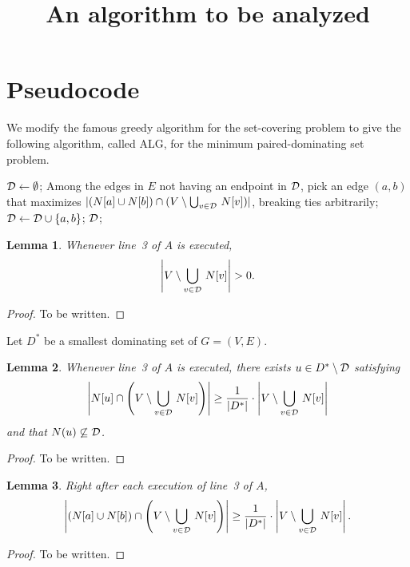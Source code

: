\documentclass[12pt]{article}
\title{An algorithm to be analyzed}
\date{}
\begin{document}
\maketitle

\newtheorem{lemma}{Lemma}

\section{Pseudocode}

We modify
the
famous greedy algorithm for the set-covering problem
to give the following algorithm, called ALG, for
the minimum paired-dominating set problem.

\begin{algorithmic}[1]
\STATE ${\cal D}\leftarrow \emptyset$;
  \STATE Among the edges in $E$ not having an endpoint in ${\cal D}$, pick
an edge $(a,b)$
that maximizes $|(N[a]\cup N[b])\cap (V\setminus \bigcup_{v\in {\cal D}}\,N[v])|$,
breaking ties arbitrarily;
  \STATE ${\cal D}\leftarrow {\cal D}\cup\{a,b\}$;
\ENDWHILE
\RETURN ${\cal D}$;
\end{algorithmic}

\begin{lemma}
Whenever line~3 of $A$ is executed,
$$
\left|V\setminus \bigcup_{v\in {\cal D}}\,N[v]\right|>0.
$$
\end{lemma}
\begin{proof}
To be written.
\end{proof}

Let $D^*$ be a smallest dominating set of $G=(V,E)$.

\begin{lemma}
Whenever line~3 of $A$ is executed,
there exists $u\in D^*\setminus {\cal D}$ satisfying
$$
\left|N[u]\cap \left(V\setminus \bigcup_{v\in {\cal D}}\,N[v]\right)\right|
\ge \frac{1}{|D^*|}
\cdot\left|V\setminus \bigcup_{v\in {\cal D}}\,N[v]\right|
$$
and that $N(u)\not\subseteq {\cal D}$.
\end{lemma}
\begin{proof}
To be written.
\end{proof}

\begin{lemma}
Right after each execution of
line~3 of $A$,
$$
\left|\left(N[a]\cup N[b]\right)\cap \left(V\setminus \bigcup_{v\in {\cal D}}\,N[v]\right)\right|
\ge \frac{1}{|D^*|}
\cdot\left|V\setminus \bigcup_{v\in {\cal D}}\,N[v]\right|.
$$
\end{lemma}
\begin{proof}
To be written.
\end{proof}
\end{document}
